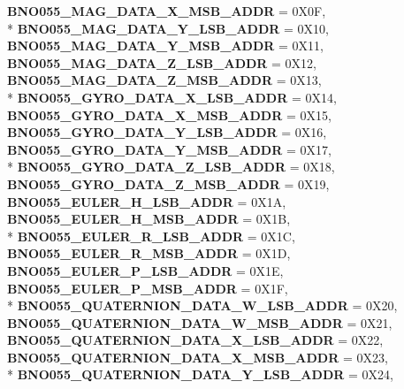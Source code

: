 \begin{DoxyCompactItemize}
{\bfseries B\-N\-O055\-\_\-\-M\-A\-G\-\_\-\-D\-A\-T\-A\-\_\-\-X\-\_\-\-M\-S\-B\-\_\-\-A\-D\-D\-R} = 0\-X0\-F, 
\\*
{\bfseries B\-N\-O055\-\_\-\-M\-A\-G\-\_\-\-D\-A\-T\-A\-\_\-\-Y\-\_\-\-L\-S\-B\-\_\-\-A\-D\-D\-R} = 0\-X10, 
{\bfseries B\-N\-O055\-\_\-\-M\-A\-G\-\_\-\-D\-A\-T\-A\-\_\-\-Y\-\_\-\-M\-S\-B\-\_\-\-A\-D\-D\-R} = 0\-X11, 
{\bfseries B\-N\-O055\-\_\-\-M\-A\-G\-\_\-\-D\-A\-T\-A\-\_\-\-Z\-\_\-\-L\-S\-B\-\_\-\-A\-D\-D\-R} = 0\-X12, 
{\bfseries B\-N\-O055\-\_\-\-M\-A\-G\-\_\-\-D\-A\-T\-A\-\_\-\-Z\-\_\-\-M\-S\-B\-\_\-\-A\-D\-D\-R} = 0\-X13, 
\\*
{\bfseries B\-N\-O055\-\_\-\-G\-Y\-R\-O\-\_\-\-D\-A\-T\-A\-\_\-\-X\-\_\-\-L\-S\-B\-\_\-\-A\-D\-D\-R} = 0\-X14, 
{\bfseries B\-N\-O055\-\_\-\-G\-Y\-R\-O\-\_\-\-D\-A\-T\-A\-\_\-\-X\-\_\-\-M\-S\-B\-\_\-\-A\-D\-D\-R} = 0\-X15, 
{\bfseries B\-N\-O055\-\_\-\-G\-Y\-R\-O\-\_\-\-D\-A\-T\-A\-\_\-\-Y\-\_\-\-L\-S\-B\-\_\-\-A\-D\-D\-R} = 0\-X16, 
{\bfseries B\-N\-O055\-\_\-\-G\-Y\-R\-O\-\_\-\-D\-A\-T\-A\-\_\-\-Y\-\_\-\-M\-S\-B\-\_\-\-A\-D\-D\-R} = 0\-X17, 
\\*
{\bfseries B\-N\-O055\-\_\-\-G\-Y\-R\-O\-\_\-\-D\-A\-T\-A\-\_\-\-Z\-\_\-\-L\-S\-B\-\_\-\-A\-D\-D\-R} = 0\-X18, 
{\bfseries B\-N\-O055\-\_\-\-G\-Y\-R\-O\-\_\-\-D\-A\-T\-A\-\_\-\-Z\-\_\-\-M\-S\-B\-\_\-\-A\-D\-D\-R} = 0\-X19, 
{\bfseries B\-N\-O055\-\_\-\-E\-U\-L\-E\-R\-\_\-\-H\-\_\-\-L\-S\-B\-\_\-\-A\-D\-D\-R} = 0\-X1\-A, 
{\bfseries B\-N\-O055\-\_\-\-E\-U\-L\-E\-R\-\_\-\-H\-\_\-\-M\-S\-B\-\_\-\-A\-D\-D\-R} = 0\-X1\-B, 
\\*
{\bfseries B\-N\-O055\-\_\-\-E\-U\-L\-E\-R\-\_\-\-R\-\_\-\-L\-S\-B\-\_\-\-A\-D\-D\-R} = 0\-X1\-C, 
{\bfseries B\-N\-O055\-\_\-\-E\-U\-L\-E\-R\-\_\-\-R\-\_\-\-M\-S\-B\-\_\-\-A\-D\-D\-R} = 0\-X1\-D, 
{\bfseries B\-N\-O055\-\_\-\-E\-U\-L\-E\-R\-\_\-\-P\-\_\-\-L\-S\-B\-\_\-\-A\-D\-D\-R} = 0\-X1\-E, 
{\bfseries B\-N\-O055\-\_\-\-E\-U\-L\-E\-R\-\_\-\-P\-\_\-\-M\-S\-B\-\_\-\-A\-D\-D\-R} = 0\-X1\-F, 
\\*
{\bfseries B\-N\-O055\-\_\-\-Q\-U\-A\-T\-E\-R\-N\-I\-O\-N\-\_\-\-D\-A\-T\-A\-\_\-\-W\-\_\-\-L\-S\-B\-\_\-\-A\-D\-D\-R} = 0\-X20, 
{\bfseries B\-N\-O055\-\_\-\-Q\-U\-A\-T\-E\-R\-N\-I\-O\-N\-\_\-\-D\-A\-T\-A\-\_\-\-W\-\_\-\-M\-S\-B\-\_\-\-A\-D\-D\-R} = 0\-X21, 
{\bfseries B\-N\-O055\-\_\-\-Q\-U\-A\-T\-E\-R\-N\-I\-O\-N\-\_\-\-D\-A\-T\-A\-\_\-\-X\-\_\-\-L\-S\-B\-\_\-\-A\-D\-D\-R} = 0\-X22, 
{\bfseries B\-N\-O055\-\_\-\-Q\-U\-A\-T\-E\-R\-N\-I\-O\-N\-\_\-\-D\-A\-T\-A\-\_\-\-X\-\_\-\-M\-S\-B\-\_\-\-A\-D\-D\-R} = 0\-X23, 
\\*
{\bfseries B\-N\-O055\-\_\-\-Q\-U\-A\-T\-E\-R\-N\-I\-O\-N\-\_\-\-D\-A\-T\-A\-\_\-\-Y\-\_\-\-L\-S\-B\-\_\-\-A\-D\-D\-R} = 0\-X24, 

\end{DoxyCompactItemize}

